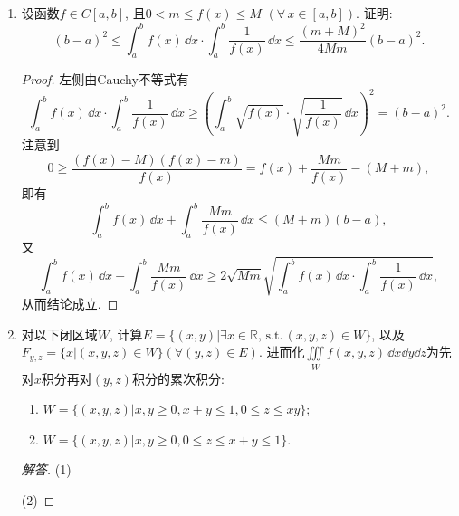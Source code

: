 \begin{quiza}
\begin{enumerate}
\item 设函数\(f\in C[a,b]\), 且\(0<m\leqslant f(x)\leqslant M\) \((\forall\, x\in[a,b])\). 
证明:\[(b-a)^2\leqslant\int_{a}^{b}f(x)\,\dd x\cdot\int_{a}^{b}\frac{1}{f(x)}\,\dd x
\leqslant\frac{(m+M)^2}{4Mm}(b-a)^2.\]
\begin{proof}
左侧由Cauchy不等式有\[\int_{a}^{b}f(x)\,\dd x\cdot\int_{a}^{b}\frac{1}{f(x)}\,\dd x
\geqslant\left(\int_{a}^{b}\sqrt{f(x)}\cdot\sqrt{\frac{1}{f(x)}}\,\dd x\right)^2
=(b-a)^2.\]注意到\[0\geqslant\frac{\left(f(x)-M\right)\left(f(x)-m\right)}{f(x)}
=f(x)+\frac{Mm}{f(x)}-(M+m),\]即有
\[\int_{a}^{b}f(x)\,\dd x+\int_{a}^{b}\frac{Mm}{f(x)}\,\dd x\leqslant (M+m)(b-a),\]
又\[\int_{a}^{b}f(x)\,\dd x+\int_{a}^{b}\frac{Mm}{f(x)}\,\dd x
\geqslant 2\sqrt{Mm}\sqrt{\int_{a}^{b}f(x)\,\dd x\cdot\int_{a}^{b}\frac{1}{f(x)}\,\dd x},\]
从而结论成立.
\end{proof}

\item 对以下闭区域\(W\), 计算\(E=\{(x,y)\big|\exists x\in\mathbb{R},\,\mathrm{s.t.}\,(x,y,z)\in W\}\), 
以及\(F_{y,z}=\{x\big|(x,y,z)\in W\}(\forall(y,z)\in E)\). 
进而化\(\iiint\limits_Wf(x,y,z)\,\dd x\dd y\dd z\)为先对\(x\)积分再对\((y,z)\)积分的累次积分:
\begin{enumerate}[label=(\arabic*)]
    \item \(W=\{(x,y,z)\big|x,y\geqslant 0,x+y\leqslant 1,0\leqslant z\leqslant xy\}\);
    \item \(W=\{(x,y,z)\big|x,y\geqslant 0,0\leqslant z\leqslant x+y\leqslant 1\}\).
\end{enumerate}
\begin{proof}[解答]
(1)

(2)
\end{proof}
\end{enumerate}
\end{quiza}

